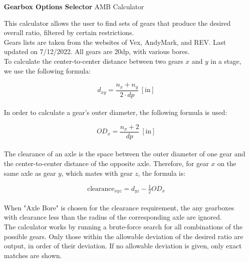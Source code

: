\documentclass[a4paper]{article}
\begin{document}
	
	\Huge\textbf{Gearbox Options Selector}
	\newline
	\LARGE AMB Calculator
	
	\vspace{0.5cm}
	\normalsize
	
	This calculator allows the user to find sets of gears that produce the desired overall ratio, filtered by certain restrictions.\\
	
	Gears lists are taken from the websites of Vex, AndyMark, and REV. Last updated on 7/12/2022. All gears are 20dp, with various bores.\\
	
	To calculate the center-to-center distance between two gears $ x $ and $ y $ in a stage, we use the following formula:
	
	\begin{equation}
		d_{xy} = \frac{n_x + n_y}{2 \cdot dp}\ \left[ \text{in} \right]
	\end{equation}
	\\
	In order to calculate a gear's outer diameter, the following formula is used:
	
	\begin{equation}
		OD_x = \frac{n_x + 2}{dp}\ \left[ \text{in} \right]
	\end{equation}
	\\
	The clearance of an axle is the space between the outer diameter of one gear and the center-to-center distance of the opposite axle. Therefore, for gear $ x $ on the same axle as gear $ y $, which mates with gear $ z $, the formula is:
	
	\begin{equation}
		\text{clearance}_{xyz} = d_{yz} - \tfrac{1}{2} OD_x
	\end{equation}
	\\
	When "Axle Bore" is chosen for the clearance requirement, the any gearboxes with clearance less than the radius of the corresponding axle are ignored.\\
	
	The calculator works by running a brute-force search for all combinations of the possible gears. Only those within the allowable deviation of the desired ratio are output, in order of their deviation. If no allowable deviation is given, only exact matches are shown.
	
	
\end{document}
